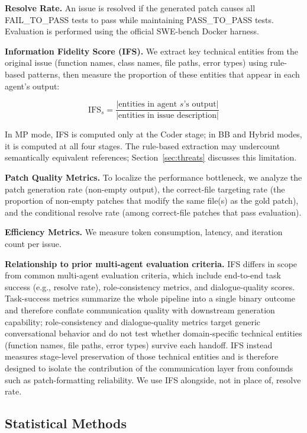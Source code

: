 \documentclass{ieeeaccess}
\begin{document}
\textbf{Resolve Rate.} An issue is resolved if the generated patch causes all FAIL\_TO\_PASS tests to pass while maintaining PASS\_TO\_PASS tests. Evaluation is performed using the official SWE-bench Docker harness.

\textbf{Information Fidelity Score (IFS).} We extract key technical entities from the original issue (function names, class names, file paths, error types) using rule-based patterns, then measure the proportion of these entities that appear in each agent's output:

\[\text{IFS}_s = \frac{|\text{entities in agent } s\text{'s output}|}{|\text{entities in issue description}|}\]

In MP mode, IFS is computed only at the Coder stage; in BB and Hybrid modes, it is computed at all four stages. The rule-based extraction may undercount semantically equivalent references; Section~\ref{sec:threats} discusses this limitation.

\textbf{Patch Quality Metrics.} To localize the performance bottleneck, we analyze the patch generation rate (non-empty output), the correct-file targeting rate (the proportion of non-empty patches that modify the same file(s) as the gold patch), and the conditional resolve rate (among correct-file patches that pass evaluation).

\textbf{Efficiency Metrics.} We measure token consumption, latency, and iteration count per issue.

\textbf{Relationship to prior multi-agent evaluation criteria.} IFS differs in scope from common multi-agent evaluation criteria, which include end-to-end task success (e.g., resolve rate), role-consistency metrics, and dialogue-quality scores. Task-success metrics summarize the whole pipeline into a single binary outcome and therefore conflate communication quality with downstream generation capability; role-consistency and dialogue-quality metrics target generic conversational behavior and do not test whether domain-specific technical entities (function names, file paths, error types) survive each handoff. IFS instead measures stage-level preservation of those technical entities and is therefore designed to isolate the contribution of the communication layer from confounds such as patch-formatting reliability. We use IFS alongside, not in place of, resolve rate.

\subsection{Statistical Methods}
\end{document}

